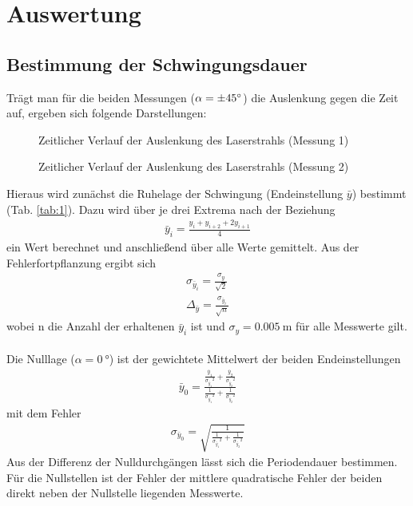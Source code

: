 \section{Auswertung}
\subsection{Bestimmung der Schwingungsdauer}
Trägt man für die beiden Messungen ($\alpha=\SI{\pm45}{\degree}$) die Auslenkung gegen die Zeit auf, ergeben sich folgende Darstellungen:
\begin{figure}[!htbp]
\centering
   
   \caption{\small{Zeitlicher Verlauf der Auslenkung des Laserstrahls (Messung 1)}}
   \label{img:1}
\end{figure}
\begin{figure}[!htbp]
\centering
   
   \caption{\small{Zeitlicher Verlauf der Auslenkung des Laserstrahls (Messung 2)}}
   \label{img:2}
\end{figure}
\newpage
Hieraus wird zunächst die Ruhelage der Schwingung (Endeinstellung $\bar{y}$) bestimmt (Tab. \ref{tab:1}). Dazu wird über je drei Extrema nach der Beziehung
\begin{align}
\bar{y}_i=\frac{y_i+y_{i+2}+2y_{i+1}}{4}
\end{align}
ein Wert berechnet und anschließend über alle Werte gemittelt. Aus der Fehlerfortpflanzung ergibt sich
\begin{align}
\sigma_{\bar{y}_i}=\frac{\sigma_y}{\sqrt{2}}\\
\Delta_{\bar{y}}=\frac{\sigma_{\bar{y}_i}}{\sqrt{n}}
\end{align}
wobei n die Anzahl der erhaltenen $\bar{y}_i$ ist und $\sigma_y=\SI{0,005}{\meter}$ für alle Messwerte gilt.\\
\ \\
Die Nulllage ($\alpha=\SI{0}{\degree}$) ist der gewichtete Mittelwert der beiden Endeinstellungen
\begin{align}
\bar{y}_0=\frac{\frac{\bar{y}_1}{{\sigma_{\bar{y}_1}}^2}+\frac{\bar{y}_2}{{\sigma_{\bar{y}_2}}^2}}{\frac{1}{{\sigma_{\bar{y}_1}}^2}+\frac{1}{{\sigma_{\bar{y}_2}}^2}}
\end{align}
mit dem Fehler
\begin{align}
\sigma_{\bar{y}_0}=\sqrt{\frac{1}{\frac{1}{{\sigma_{\bar{y}_1}}^2}+\frac{1}{{\sigma_{\bar{y}_2}}^2}}}
\end{align}
Aus der Differenz der Nulldurchgängen lässt sich die Periodendauer bestimmen. Für die Nullstellen ist der Fehler der mittlere quadratische Fehler der beiden direkt neben der Nullstelle liegenden Messwerte.

